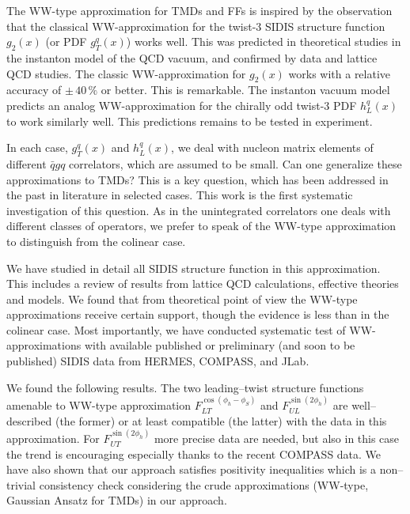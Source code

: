 \documentclass[a4paper,11pt]{article}
\begin{document}
The WW-type approximation for TMDs and FFs is inspired by the
observation that the classical WW-approximation for the twist-3
SIDIS structure function $g_2(x)$ (or PDF $g_T^q(x)$) works well. 
This was predicted in theoretical studies in the instanton model 
of the QCD vacuum, and confirmed by data and lattice QCD studies.
The classic WW-approximation for $g_2(x)$ works with a relative
accuracy of $\pm\,40\,\%$ or better. This is remarkable.
The instanton vacuum model predicts an analog WW-approximation
for the chirally odd twist-3 PDF $h_L^q(x)$ to work similarly
well. This predictions remains to be tested in experiment.

In each case, $g_T^q(x)$ and $h_L^q(x)$, we deal with nucleon
matrix elements of different $\bar qgq$ correlators, which are 
assumed to be small. Can one generalize these approximations to
TMDs? This is a key question, which has been addressed in the
past in literature in selected cases. This work is the first
systematic investigation of this question.
As in the unintegrated correlators one deals with different
classes of operators, we prefer to speak of the
WW-type approximation to distinguish from the colinear case.

We have studied in detail all SIDIS structure function in 
this approximation. This includes a review of results from 
lattice QCD calculations, effective theories and models.
We found that from theoretical point of view the WW-type
approximations receive certain support, though the 
evidence is less than in the colinear case.
Most importantly, we have conducted systematic test of
WW-approximations with available published or 
preliminary (and soon to be published) SIDIS data
from HERMES, COMPASS, and JLab.

We found the following results. The two leading--twist 
structure functions amenable to WW-type approximation 
	$F_{LT}^{\cos(\phi_h -\phi_S)}$ and 
	$F_{UL}^{\sin(2\phi_h)}$ 
are well--described (the former) or at least compatible 
(the latter) with the data in this approximation. For 
$F_{UT}^{\sin(2\phi_h)}$ more precise data are needed, 
but also in this case the trend is encouraging
especially thanks to the recent COMPASS data.
We have also shown that our approach satisfies positivity
inequalities which is a non--trivial consistency check 
considering the crude approximations (WW-type, Gaussian 
Ansatz for TMDs) in our approach.
\end{document}
